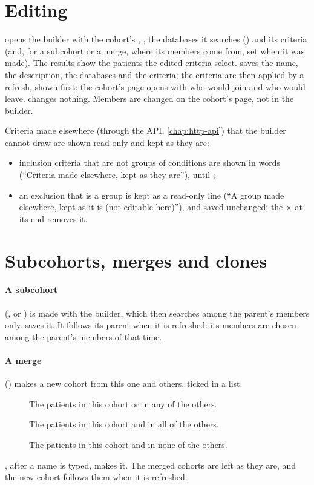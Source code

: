 \section{Editing}
\label{sec:cohorts-edit}

 opens the builder with the cohort's , , the databases it
searches () and its criteria (and,
for a subcohort or a merge, where its members come from, set when it was made). The results show
the patients the edited criteria select.  saves the name, the
description, the databases and the criteria; the criteria are then applied by a refresh, shown first: the cohort's page
opens with who would join and who would leave.  changes nothing. Members are changed
on the cohort's page, not in the builder.

Criteria made elsewhere (through the API, \cref{chap:http-api}) that the builder cannot draw
are shown read-only and kept as they are:
\begin{itemize}
\item inclusion criteria that are not groups of conditions are shown in words (``Criteria made
  elsewhere, kept as they are''), until ;
\item an exclusion that is a group is kept as a read-only line (``A group made elsewhere, kept as
  it is (not editable here)''), and saved unchanged; the $\times$ at its end removes it.
\end{itemize}

\section{Subcohorts, merges and clones}
\label{sec:cohorts-derived}

\paragraph{A subcohort} (, or ) is made with the
builder, which then searches among the parent's members only.  saves it. It follows its parent when it is refreshed: its members are chosen among the
parent's members of that time.

\paragraph{A merge} () makes a new cohort from this one and others, ticked in a
list:
\begin{description}
\item[] The patients in this cohort or in any of the others.
\item[] The patients in this cohort and in all of the others.
\item[] The patients in this cohort and in none of the others.
\end{description}
, after a name is typed, makes it. The merged cohorts are left as they are,
and the new cohort follows them when it is refreshed.

